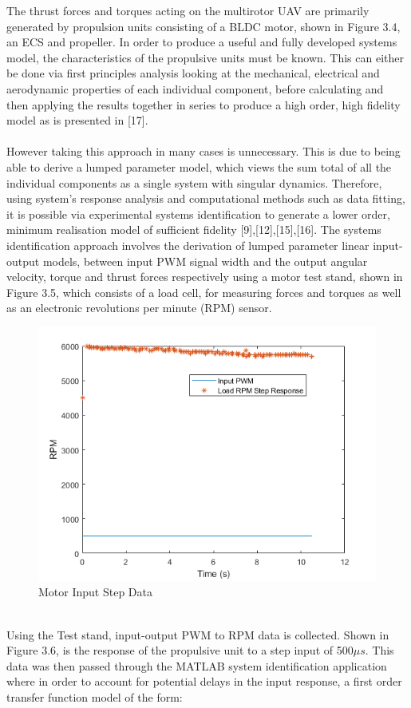 \documentclass[12pt,a4paper,twoside]{report}
\begin{document}
			The thrust forces and torques acting on the multirotor UAV are primarily generated by propulsion units consisting of a BLDC motor, shown in Figure 3.4, an ECS and propeller. In order to produce a useful and fully developed systems model, the characteristics of the propulsive units must be known. This can either be done via first principles analysis looking at the mechanical, electrical and aerodynamic properties of each individual component, before calculating and then applying the results together in series to produce a high order, high fidelity model as is presented in [17]. 
			\\ \\
			However taking this approach in many cases is unnecessary. This is due to being able to derive a lumped parameter model, which views the sum total of all the individual components as a single system with singular dynamics. Therefore, using system's response analysis and computational methods such as data fitting, it is possible via experimental systems identification to generate a lower order, minimum realisation model of sufficient fidelity [9],[12],[15],[16]. The systems identification approach involves the derivation of lumped parameter linear input-output models, between input PWM signal width and the output angular velocity, torque and thrust forces respectively using a motor test stand, shown in Figure 3.5, which consists of a load cell, for measuring forces and torques as well as an electronic revolutions per minute (RPM) sensor.
			\\
			\begin{figure}[h!]
				\centering
				\includegraphics[width=0.7\linewidth]{InputStepData.png}
				\caption{Motor Input Step Data}
				\label{fig:inputstepdata}
			\end{figure}
			\\
			Using the Test stand, input-output PWM to RPM data is collected. Shown in Figure 3.6, is the response of the propulsive unit to a step input of 500$\mu s$. This data was then passed through the MATLAB system identification application where in order to account for potential delays in the input response, a first order transfer function model of the form:
\end{document}
